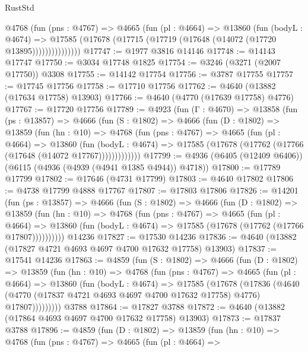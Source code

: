 \begin{lexlean}{RustStd}
\begin{coremodule}
              @4768
                (fun (pns : @4767) =>
                @4665
                  (fun (pl : @4664) =>
                  @13860
                    (fun (bodyL : @4674) =>
                    @17585 (@17678 (@17715 (@17719 (@17648 (@14072 (@17720 @13895)))))))))))))))
@17747 := @1977 @3816 @14146
@17748 := @14143 @17747
@17750 := @3034 @17748 @1825
@17754 := @3246 (@3271 (@2007 @17750)) @3308
@17755 := @14142 @17754
@17756 := @3787 @17755
@17757 := @17745 @17756
@17758 := @17710 @17756
@17762 := @4640 (@13882 (@17634 @17758) @13903)
@17766 := @4640 (@4770 (@17639 @17758) @4776)
@17767 := @17720 @17756
@17789 := @4923
    (fun (Γ : @4670) =>
    @13858
      (fun (ps : @13857) =>
      @4666
        (fun (S : @1802) =>
        @4666
          (fun (D : @1802) =>
          @13859
            (fun (hn : @10) =>
            @4768
              (fun (pns : @4767) =>
              @4665
                (fun (pl : @4664) =>
                @13860
                  (fun (bodyL : @4674) =>
                  @17585 (@17678 (@17762 (@17766 (@17648 (@14072 @17767)))))))))))))
@17799 := @4936 (@6405 (@12409 @6406)) (@6115 (@4936 (@4939 (@4941 @1385 @4944)) @4718))
@17800 := @17789 @17799
@17802 := @17646 (@4731 @17799)
@17803 := @4640 @17802
@17806 := @4738 @17799 @4888 @17767
@17807 := @17803 @17806
@17826 := @14201
    (fun (ps : @13857) =>
    @4666
      (fun (S : @1802) =>
      @4666
        (fun (D : @1802) =>
        @13859
          (fun (hn : @10) =>
          @4768
            (fun (pns : @4767) =>
            @4665
              (fun (pl : @4664) =>
              @13860 (fun (bodyL : @4674) => @17585 (@17678 (@17762 (@17766 @17807))))))))))
    @14236
@17827 := @17530 @14236
@17836 := @4640 (@13882 (@17827 @4721 @4693 @4697 @4700 @17632 @17758) @13903)
@17837 := @17541 @14236
@17863 := @4859
    (fun (S : @1802) =>
    @4666
      (fun (D : @1802) =>
      @13859
        (fun (hn : @10) =>
        @4768
          (fun (pns : @4767) =>
          @4665
            (fun (pl : @4664) =>
            @13860
              (fun (bodyL : @4674) =>
              @17585
                (@17678
                  (@17836
                    (@4640
                      (@4770 (@17837 @4721 @4693 @4697 @4700 @17632 @17758) @4776)
                      @17807)))))))))
    @3788
@17864 := @17827 @3788
@17872 := @4640 (@13882 (@17864 @4693 @4697 @4700 @17632 @17758) @13903)
@17873 := @17837 @3788
@17896 := @4859
    (fun (D : @1802) =>
    @13859
      (fun (hn : @10) =>
      @4768
        (fun (pns : @4767) =>
        @4665
          (fun (pl : @4664) =>

\end{coremodule}
\end{lexlean}
